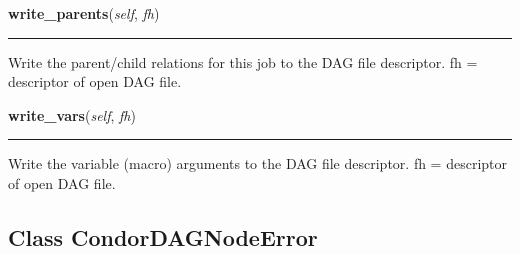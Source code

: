     \label{pipeline:CondorDAGNode:write_parents}
    \vspace{0.5ex}

    \noindent\begin{boxedminipage}{\textwidth}

    \raggedright \textbf{write\_parents}(\textit{self}, \textit{fh})

    \vspace{-1.5ex}

    \rule{\textwidth}{0.5\fboxrule}
    Write the parent/child relations for this job to the DAG file 
    descriptor. fh = descriptor of open DAG file.

    \vspace{1ex}

    \end{boxedminipage}

    \label{pipeline:CondorDAGNode:write_vars}
    \vspace{0.5ex}

    \noindent\begin{boxedminipage}{\textwidth}

    \raggedright \textbf{write\_vars}(\textit{self}, \textit{fh})

    \vspace{-1.5ex}

    \rule{\textwidth}{0.5\fboxrule}
    Write the variable (macro) arguments to the DAG file descriptor. fh = 
    descriptor of open DAG file.

    \vspace{1ex}

    \end{boxedminipage}



\subsection{Class CondorDAGNodeError}

